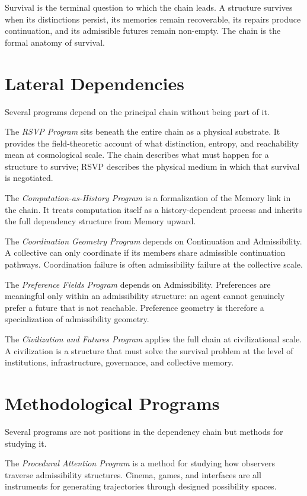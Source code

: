 \documentclass[12pt, openany]{book}
\begin{document}
Survival is the terminal question to which the chain leads. A structure
survives when its distinctions persist, its memories remain recoverable,
its repairs produce continuation, and its admissible futures remain
non-empty. The chain is the formal anatomy of survival.

\section{Lateral Dependencies}

Several programs depend on the principal chain without being part of it.

The \textit{RSVP Program} sits beneath the entire chain as a physical
substrate. It provides the field-theoretic account of what distinction,
entropy, and reachability mean at cosmological scale. The chain describes
what must happen for a structure to survive; RSVP describes the physical
medium in which that survival is negotiated.

The \textit{Computation-as-History Program} is a formalization of the
Memory link in the chain. It treats computation itself as a
history-dependent process and inherits the full dependency structure from
Memory upward.

The \textit{Coordination Geometry Program} depends on Continuation and
Admissibility. A collective can only coordinate if its members share
admissible continuation pathways. Coordination failure is often
admissibility failure at the collective scale.

The \textit{Preference Fields Program} depends on Admissibility.
Preferences are meaningful only within an admissibility structure: an
agent cannot genuinely prefer a future that is not reachable. Preference
geometry is therefore a specialization of admissibility geometry.

The \textit{Civilization and Futures Program} applies the full chain at
civilizational scale. A civilization is a structure that must solve the
survival problem at the level of institutions, infrastructure, governance,
and collective memory.

\section{Methodological Programs}

Several programs are not positions in the dependency chain but methods
for studying it.

The \textit{Procedural Attention Program} is a method for studying how
observers traverse admissibility structures. Cinema, games, and interfaces
are all instruments for generating trajectories through designed possibility
spaces.
\end{document}
